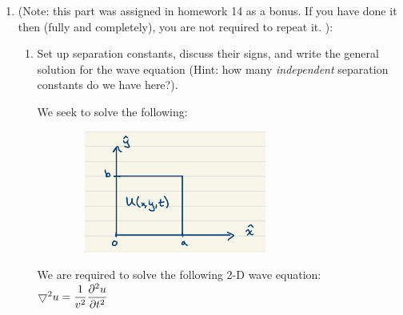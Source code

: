 \documentclass[fleqn]{article}
\begin{document}
  \begin{enumerate}
  \item  (Note: this part was assigned in homework 14 as a bonus. If you have done it then (fully and completely), you are not required to repeat it. ): 

    \begin{enumerate}
    \item Set up separation constants, discuss their signs, and write the general solution for the wave equation (Hint: how many \emph{independent} separation constants do we have here?).

      \textcolor{hwColor}{
        We seek to solve the following: \\
      }

      \begin{figure}[htbp] 
        \begin{center} 
          \includegraphics[height=4cm, width=7cm]{drum.PNG} 
        \label{default} 
        \end{center} 
      \end{figure} 

      \textcolor{hwColor}{
        We are required to solve the following 2-D wave equation: \\
        $
          \bigtriangledown^2 u=\dfrac{1}{v^2}\dfrac{\partial^2 u}{\partial t^2} \\
        $
      }


\end{enumerate}
\end{enumerate}
\end{document}
